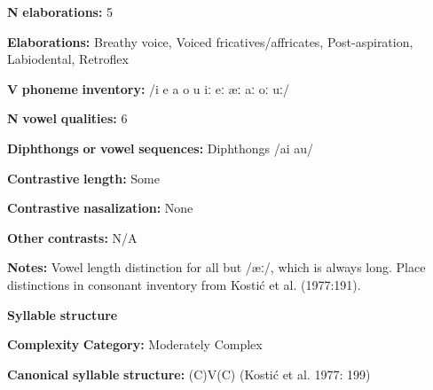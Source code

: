 \begin{styleBody}
\textbf{N} \textbf{elaborations:} 5
\end{styleBody}

\begin{styleBody}
\textbf{Elaborations:} Breathy voice, Voiced fricatives/affricates, Post-aspiration, Labiodental, Retroflex
\end{styleBody}

\begin{styleBody}
\textbf{V} \textbf{phoneme} \textbf{inventory:} /i e a o u iː eː æː aː oː uː/
\end{styleBody}

\begin{styleBody}
\textbf{N} \textbf{vowel} \textbf{qualities:} 6
\end{styleBody}

\begin{styleBody}
\textbf{Diphthongs} \textbf{or} \textbf{vowel} \textbf{sequences:} Diphthongs /ai au/
\end{styleBody}

\begin{styleBody}
\textbf{Contrastive} \textbf{length:} Some
\end{styleBody}

\begin{styleBody}
\textbf{Contrastive} \textbf{nasalization:} None
\end{styleBody}

\begin{styleBody}
\textbf{Other} \textbf{contrasts:} N/A
\end{styleBody}

\begin{styleBody}
\textbf{Notes:} Vowel length distinction for all but /æː/, which is always long. Place distinctions in consonant inventory from Kostić et al. (1977:191).
\end{styleBody}

\begin{styleBody}
\textbf{Syllable} \textbf{structure}
\end{styleBody}

\begin{styleBody}
\textbf{Complexity} \textbf{Category:} Moderately Complex
\end{styleBody}

\begin{styleBody}
\textbf{Canonical} \textbf{syllable} \textbf{structure:} (C)V(C) (Kostić et al. 1977: 199)
\end{styleBody}

